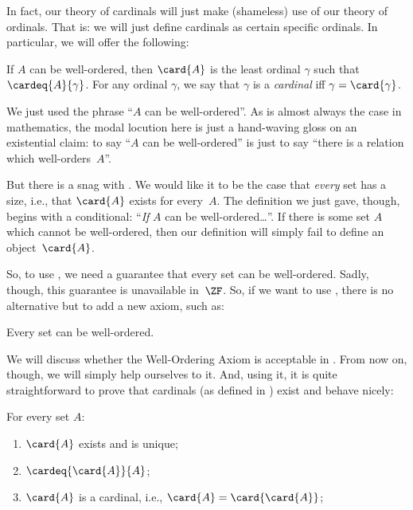 \documentclass[../../../include/open-logic-section]{subfiles}
\begin{document}

In fact, our theory of cardinals will just make (shameless) use of our
theory of ordinals. That is: we will just define cardinals as certain
specific ordinals. In particular, we will offer the following:

\begin{defn}
If $A$ can be well-ordered, then $\card{A}$ is the least ordinal
$\gamma$ such that $\cardeq{A}{\gamma}$. For any ordinal $\gamma$, we
say that $\gamma$ is a \emph{cardinal} iff $\gamma = \card{\gamma}$.
\end{defn}

We just used the phrase ``$A$ can be well-ordered''. As is almost
always the case in mathematics, the modal locution here is just a
hand-waving gloss on an existential claim: to say ``$A$ can be
well-ordered'' is just to say ``there is a relation which
well-orders~$A$''. 

But there is a snag with . We would like
it to be the case that \emph{every} set has a size, i.e., that
$\card{A}$ exists for every~$A$. The definition we just gave, though,
begins with a conditional: ``\emph{If} $A$ can be
well-ordered\ldots''. If there is some set $A$ which cannot be
well-ordered, then our definition will simply fail to define an object~$\card{A}$.

So, to use , we need a guarantee that
every set can be well-ordered. Sadly, though, this guarantee is
unavailable in~$\ZF$. So, if we want to use
, there is no alternative but to add a new
axiom, such as:
\begin{axiom}
Every set can be well-ordered.
\end{axiom}
We will discuss whether the Well-Ordering Axiom is acceptable in
. From now on, though, we will simply help
ourselves to it. And, using it, it is quite straightforward to prove
that cardinals (as defined in ) exist and
behave nicely:

\begin{lem}
For every set $A$:
\begin{enumerate}
	\item{} $\card{A}$ exists and is unique;
	\item{}  $\cardeq{\card{A}}{A}$;
	\item{}  $\card{A}$ is a cardinal, i.e.,
	$\card{A} = \card{\card{A}}$;
\end{enumerate}
\end{lem}
\end{document}
